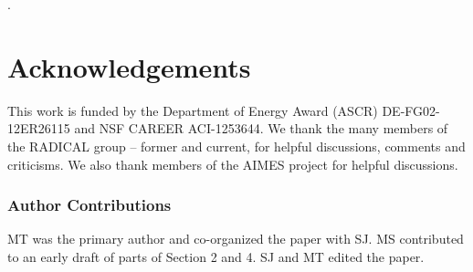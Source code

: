 \documentclass{sig-alternate}
\begin{document}
.




%

%

%
\section*{Acknowledgements}

{\footnotesize{This work is funded by the Department of Energy Award (ASCR)
    DE-FG02-12ER26115 and NSF CAREER ACI-1253644. We thank the many members of
    the RADICAL group -- former and current, for helpful discussions, comments
    and criticisms. We also thank members of the AIMES project for helpful
    discussions.}}

\subsubsection*{Author Contributions} MT was the primary author and co-organized
the paper with SJ. MS contributed to an early draft of parts of Section 2 and 4.
SJ and MT edited the paper.



%


\end{document}
